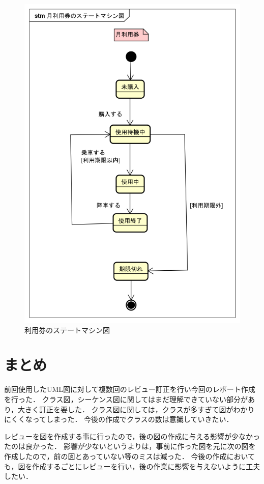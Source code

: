 \documentclass[documentclass]{jsarticle}
\begin{document}
\begin{figure}[h]
\begin{minipage}[b]{0.49\columnwidth}
      \includegraphics[width=0.9\columnwidth]{figure/8-2.png}
      \caption{利用券のステートマシン図}
      \label{fig:8-2}
  \end{minipage}
\end{figure}


\section{まとめ}
前回使用したUML図に対して複数回のレビュー訂正を行い今回のレポート作成を行った．
クラス図，シーケンス図に関してはまだ理解できていない部分があり，大きく訂正を要した．
クラス図に関しては，クラスが多すぎて図がわかりにくくなってしまった．
今後の作成でクラスの数は意識していきたい．

レビューを図を作成する事に行ったので，後の図の作成に与える影響が少なかったのは良かった．
影響が少ないというよりは，事前に作った図を元に次の図を作成したので，前の図とあっていない等のミスは減った．
今後の作成においても，図を作成するごとにレビューを行い，後の作業に影響を与えないように工夫したい．
\end{document}
